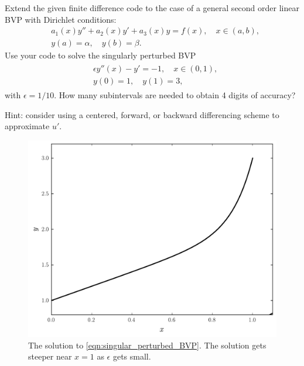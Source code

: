 \begin{problem}
Extend the given finite difference code to the case of a general second order linear BVP with Dirichlet conditions:
\begin{align*}
	&{ } a_1(x)y'' +a_2(x)y'+ a_3(x) y = f(x), \quad x \in (a,b),\\
	&{ } y(a) = \alpha, \quad y(b) = \beta.
\end{align*}
Use your code to solve the singularly perturbed BVP
\begin{align}
	\begin{split}
	&{ } \epsilon y''(x)-y'= -1, \quad x \in (0,1), \\
	&{ } y(0) = 1, \quad y(1) = 3,
	\end{split} \label{eqn:singular_perturbed_BVP}
\end{align}
with $\epsilon = 1/10$.
How many subintervals are needed to obtain 4 digits of accuracy?

Hint: consider using a centered, forward, or backward differencing scheme to approximate $u'$.

\end{problem}

\begin{figure}
\includegraphics[width=\textwidth]{figure2.pdf}
\caption{The solution to \eqref{eqn:singular_perturbed_BVP}.
The solution gets steeper near $x = 1$ as $\epsilon $ gets small.}
\end{figure}


